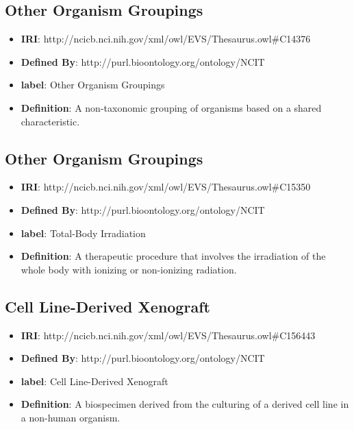 \documentclass[a4paper,12pt,oneside]{article}
\begin{document}
  \subsection{Other Organism Groupings}

   \begin{itemize}
      \item \textbf{IRI}: http://ncicb.nci.nih.gov/xml/owl/EVS/Thesaurus.owl\#C14376
      \item \textbf{Defined By}: http://purl.bioontology.org/ontology/NCIT
      \item \textbf{label}: Other Organism Groupings
      \item \textbf{Definition}: A non-taxonomic grouping of organisms based on a shared characteristic.
  \end{itemize}  

  \subsection{Other Organism Groupings}

   \begin{itemize}
      \item \textbf{IRI}: http://ncicb.nci.nih.gov/xml/owl/EVS/Thesaurus.owl\#C15350
      \item \textbf{Defined By}: http://purl.bioontology.org/ontology/NCIT
      \item \textbf{label}: Total-Body Irradiation
      \item \textbf{Definition}: A therapeutic procedure that involves the irradiation of the whole body with ionizing or non-ionizing radiation.
  \end{itemize}  


   \subsection{Cell Line-Derived Xenograft}

   \begin{itemize}
      \item \textbf{IRI}: http://ncicb.nci.nih.gov/xml/owl/EVS/Thesaurus.owl\#C156443
      \item \textbf{Defined By}: http://purl.bioontology.org/ontology/NCIT
      \item \textbf{label}: Cell Line-Derived Xenograft
      \item \textbf{Definition}: A biospecimen derived from the culturing of a derived cell line in a non-human organism.
  \end{itemize}  
\end{document}
